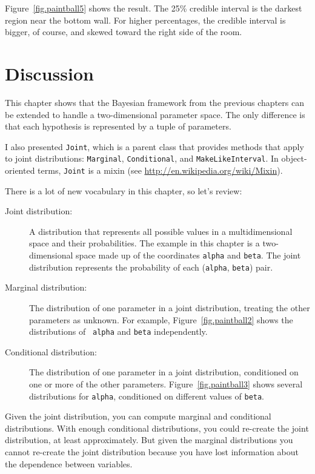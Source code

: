 \documentclass[12pt]{book}
\theoremstyle{exercise}
\begin{document}
Figure~\ref{fig.paintball5} shows the result.  The 25\% credible
interval is the darkest region near the bottom wall.  For higher
percentages, the credible interval is bigger, of course, and skewed
toward the right side of the room.


\section{Discussion}

This chapter shows that the Bayesian framework from the previous
chapters can be extended to handle a two-dimensional parameter space.
The only difference is that each hypothesis is represented by
a tuple of parameters.

I also presented {\tt Joint}, which is a parent class that provides
methods that apply to joint distributions:
{\tt Marginal}, {\tt Conditional}, and {\tt MakeLikeInterval}.
In object-oriented terms,
{\tt Joint} is a mixin (see \url{http://en.wikipedia.org/wiki/Mixin}).

There is a lot of new vocabulary in this chapter, so let's review:

\begin{description}

\item[Joint distribution:] A distribution that represents all possible
  values in a multidimensional space and their probabilities.  The
  example in this chapter is a two-dimensional space made up of the
  coordinates {\tt alpha} and {\tt beta}.  The joint distribution
  represents the probability of each ({\tt alpha}, {\tt beta}) pair.

\item[Marginal distribution:] The distribution of one parameter in a
  joint distribution, treating the other parameters as unknown.  For
  example, Figure~\ref{fig.paintball2} shows the distributions of {\tt
    alpha} and {\tt beta} independently.

\item[Conditional distribution:] The distribution of one parameter in
  a joint distribution, conditioned on one or more of the other
  parameters.  Figure~\ref{fig.paintball3} shows several distributions for
  {\tt alpha}, conditioned on different values of {\tt beta}.

\end{description}

Given the joint distribution, you can compute marginal and conditional
distributions.  With enough conditional distributions, you could
re-create the joint distribution, at least approximately.  But given
the marginal distributions you cannot re-create the joint distribution
because you have lost information about the dependence between
variables.
\end{document}
